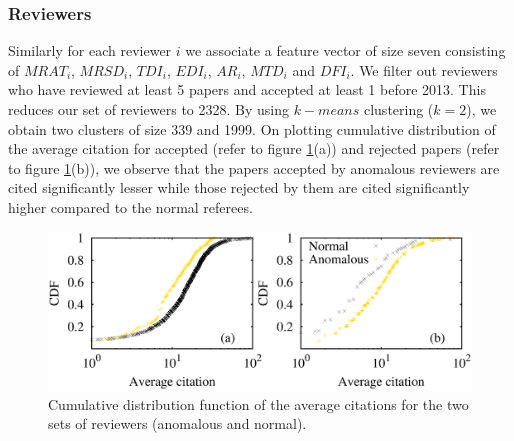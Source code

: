 \subsubsection{Reviewers}

Similarly for each reviewer $i$ we associate a feature vector of size seven consisting of $MRAT_{i}$, $MRSD_{i}$, $TDI_{i}$, $EDI_{i}$, $AR_{i}$, $MTD_{i}$ and $DFI_{i}$. 
We filter out reviewers who have reviewed at least 5 papers and accepted at least 1 before 2013. This reduces our set of reviewers to 2328. By using $k-means$ clustering ($k=2$), we obtain two clusters of size 339 and 
1999. On plotting cumulative distribution of the average citation for accepted (refer to figure \ref{rev_pred}(a)) and rejected papers (refer to figure \ref{rev_pred}(b)), we observe that the papers accepted by anomalous reviewers are cited significantly lesser while those rejected by them are cited significantly higher compared to the normal referees.

\begin{figure}
\centering
\includegraphics[scale=0.27]{./texfiles/Chapter_4/cikm/figures/reviewer_all_anom.eps}
\caption{\label{rev_pred}Cumulative distribution function of the average citations for the two sets of reviewers (anomalous and normal).\vspace{4mm}}
\vspace{3mm}
\end{figure}
\medskip